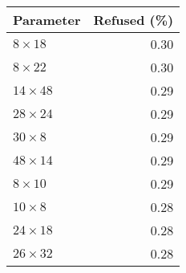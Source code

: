 \begin{tabular}{lr}
\toprule
      Parameter &  Refused (\%) \\
\midrule
  $8 \times 18$ &          0.30 \\
  $8 \times 22$ &          0.30 \\
 $14 \times 48$ &          0.29 \\
 $28 \times 24$ &          0.29 \\
  $30 \times 8$ &          0.29 \\
 $48 \times 14$ &          0.29 \\
  $8 \times 10$ &          0.29 \\
  $10 \times 8$ &          0.28 \\
 $24 \times 18$ &          0.28 \\
 $26 \times 32$ &          0.28 \\
\bottomrule
\end{tabular}

